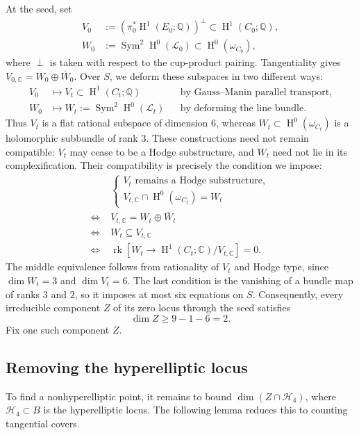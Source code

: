 \documentclass{amsart}
\DeclareMathOperator{\Sym}{Sym}
\DeclareMathOperator{\Hnm}{H}
\DeclareMathOperator{\rk}{rk}
\begin{document}
At the seed, set
\[
\begin{aligned}
V_0&:=\left(\pi_0^*\Hnm^1(E_0;\mathbb{Q})\right)^\perp
\subset\Hnm^1(C_0;\mathbb{Q}),\\
W_0&:=\Sym^2\Hnm^0(\mathcal{L}_0)\subset\Hnm^0(\omega_{C_0}),
\end{aligned}
\]
where $\perp$ is taken with respect to the cup-product pairing.
Tangentiality gives $V_{0,\mathbb{C}}=W_0\oplus\overline{W}_0$.
Over $S$, we deform these subspaces in two different ways:
\[
\begin{aligned}
V_0&\longmapsto V_t\subset\Hnm^1(C_t;\mathbb{Q})
&&\text{by Gauss--Manin parallel transport},\\
W_0&\longmapsto W_t:=\Sym^2\Hnm^0(\mathcal{L}_t)
&&\text{by deforming the line bundle}.
\end{aligned}
\]
Thus $V_t$ is a flat rational subspace of dimension $6$, whereas
$W_t\subset\Hnm^0(\omega_{C_t})$ is a holomorphic subbundle of rank $3$.
These constructions need not remain compatible: $V_t$ may cease to be
a Hodge substructure, and $W_t$ need not lie in its complexification.
Their compatibility is precisely the condition we impose:
\[
\begin{aligned}
&\begin{cases}
V_t\text{ remains a Hodge substructure},\\
V_{t,\mathbb{C}}\cap\Hnm^0(\omega_{C_t})=W_t
\end{cases}\\
\Longleftrightarrow\;& V_{t,\mathbb{C}}=W_t\oplus\overline{W}_t\\
\Longleftrightarrow\;& W_t\subseteq V_{t,\mathbb{C}}\\
\Longleftrightarrow\;&
\rk\left[W_t\longrightarrow\Hnm^1(C_t;\mathbb{C})/V_{t,\mathbb{C}}\right]=0.
\end{aligned}
\]
The middle equivalence follows from rationality of $V_t$ and Hodge type,
since $\dim W_t=3$ and $\dim V_t=6$. The last condition is the vanishing
of a bundle map of ranks $3$ and $2$, so it imposes at most six equations
on $S$. Consequently, every irreducible component $Z$ of its zero locus
through the seed satisfies
\[
\dim Z\geqslant9-1-6=2.
\]
Fix one such component $Z$.

\subsection{Removing the hyperelliptic locus}\label{subsec:hyperelliptic}

To find a nonhyperelliptic point, it remains to bound
$\dim\left(Z\cap\mathcal{H}_4\right)$, where $\mathcal{H}_4\subset B$
is the hyperelliptic locus. The following lemma reduces this to counting
tangential covers.
\end{document}
